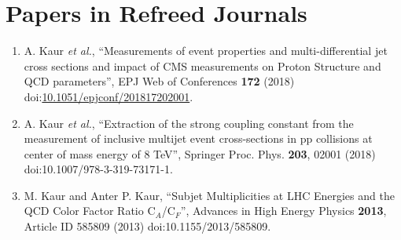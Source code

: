\section*{Papers in Refreed Journals}
\begin{enumerate}

\item A. Kaur {\it et al.}, ``Measurements of event properties and multi-differential jet cross sections and impact of CMS measurements on Proton Structure and QCD parameters'', EPJ Web of Conferences {\bf 172} (2018) doi:\href{https://doi.org/10.1051/epjconf/201817202001}{10.1051/epjconf/201817202001}.

\item A. Kaur {\it et al.}, ``Extraction of the strong coupling constant from the measurement of inclusive multijet event cross-sections in pp collisions at center of mass energy of 8 TeV'', Springer Proc. Phys. {\bf 203}, 02001 (2018) doi:10.1007/978-3-319-73171-1.

\item M. Kaur and Anter P. Kaur, ``Subjet Multiplicities at LHC Energies and the QCD Color Factor Ratio C$_{A}$/C$_{F}$'', Advances in High Energy Physics {\bf 2013}, Article ID 585809 (2013) doi:10.1155/2013/585809.
\
\end{enumerate}

\noindent\makebox[\textwidth]{\rule{\textwidth}{1pt}} 

